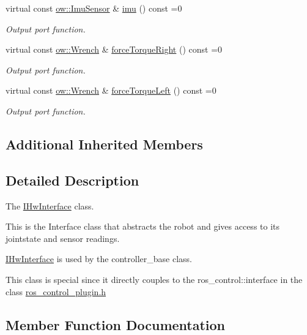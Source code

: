 \begin{DoxyCompactItemize}
\item 
virtual const \hyperlink{classow__core_1_1InertialMeasurmentUnitSensor}{ow\+::\+Imu\+Sensor} \& \hyperlink{classow_1_1IHwInterface_ab96192139860a2000cf7f090800daf10}{imu} () const =0
\begin{DoxyCompactList}\small\item\em Output port function. \end{DoxyCompactList}\item 
virtual const \hyperlink{classow__core_1_1Wrench}{ow\+::\+Wrench} \& \hyperlink{classow_1_1IHwInterface_a138666171127477f34eec1be1f6bbadc}{force\+Torque\+Right} () const =0
\begin{DoxyCompactList}\small\item\em Output port function. \end{DoxyCompactList}\item 
virtual const \hyperlink{classow__core_1_1Wrench}{ow\+::\+Wrench} \& \hyperlink{classow_1_1IHwInterface_af25dda9d79de54676fa154706963d798}{force\+Torque\+Left} () const =0
\begin{DoxyCompactList}\small\item\em Output port function. \end{DoxyCompactList}\end{DoxyCompactItemize}
\subsection*{Additional Inherited Members}


\subsection{Detailed Description}
The \hyperlink{classow_1_1IHwInterface}{I\+Hw\+Interface} class. 

This is the Interface class that abstracts the robot and gives access to its jointstate and sensor readings.

\hyperlink{classow_1_1IHwInterface}{I\+Hw\+Interface} is used by the controller\+\_\+base class.

This class is special since it directly couples to the ros\+\_\+control\+::interface in the class \hyperlink{ros__control__plugin_8h_source}{ros\+\_\+control\+\_\+plugin.\+h} 

\subsection{Member Function Documentation}
